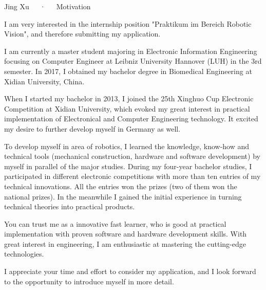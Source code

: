 \documentclass[11pt, a4paper]{awesome-cv}
\providecommand{\applicatename}{Praktikum im Bereich Robotic Vision}
\begin{document}
\makecvheader[R]

\makecvfooter
  {}
  {Jing Xu~~~·~~~Motivation}
  {}

\makelettertitle

\begin{cvletter}

I am very interested in the internship position "\applicatename", and therefore submitting my application.

I am currently a master student majoring in Electronic Information Engineering focusing on Computer Engineer at Leibniz University Hannover (LUH) in the 3rd semester. In 2017, I obtained my bachelor degree in Biomedical Engineering at Xidian University, China. 

When I started my bachelor in 2013, I joined the 25th Xinghuo Cup Electronic Competition at Xidian University, which evoked my great interest in practical implementation of Electronical and Computer Engineering technology. It excited my desire to further develop myself in Germany as well. 

To develop myself in area of robotics, I learned the knowledge, know-how and technical tools (mechanical construction, hardware and software development) by myself in parallel of the major studies. During my four-year bachelor studies, I participated in different electronic competitions with more than ten entries of my technical innovations. All the entries won the prizes (two of them won the national prizes). In the meanwhile I gained the initial experience in turning technical theories into practical products. 

You can trust me as a innovative fast learner, who is good at practical implementation with proven software and hardware development skills. With great interest in engineering, I am enthusiastic at mastering the cutting-edge technologies. 

I appreciate your time and effort to consider my application, and I look forward to the opportunity to introduce myself in more detail. \\\\



\end{cvletter}


\makeletterclosing
\end{document}
